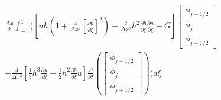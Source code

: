 \begin{multline*}
\frac{\Delta x}{2}\int_{-1 }^{1} \Bigg( \left[ uh \left(1 + \frac{4}{\Delta x^2} \left[\frac{\partial b}{\partial \xi}\right]^2 \right)  - \frac{2}{\Delta x^2} h^2 \frac{\partial b}{\partial \xi}  \frac{\partial u }{\partial \xi}  -  G \right] \begin{bmatrix}
\phi_{j-1/2}\\\phi_j \\\phi_{j+1/2}
\end{bmatrix}   \\ + \frac{4}{\Delta x^2} \left[\frac{1}{3}h^3 \frac{\partial {u}}{\partial \xi}    -     \frac{1}{2}h^2 \frac{\partial b}{\partial \xi} u    \right] \frac{\partial}{\partial \xi}\left(\begin{bmatrix}
\phi_{j-1/2}\\\phi_j \\\phi_{j+1/2}
\end{bmatrix} \right) \Bigg)d\xi.
\end{multline*}

